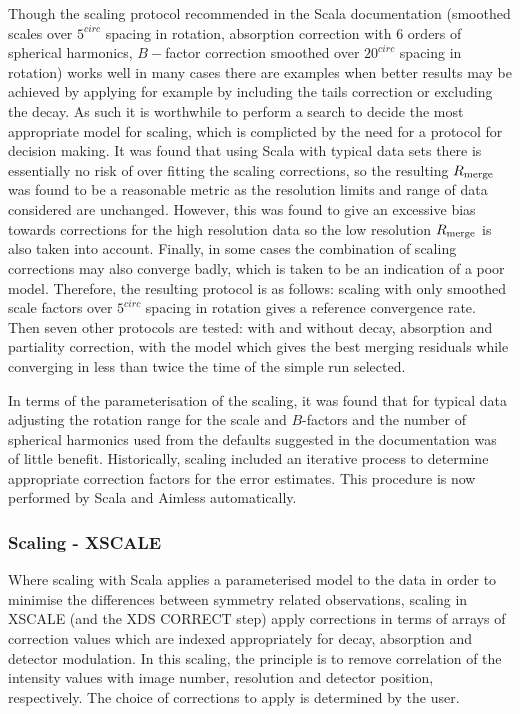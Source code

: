 \documentclass[preprint,pdf]{iucr}
\begin{document}
Though the scaling protocol recommended in the Scala documentation
(smoothed scales over $5^{circ}$ spacing in rotation, absorption
correction with 6 orders of spherical harmonics, $B-$factor correction
smoothed over $20^{circ}$ spacing in rotation) works well in many
cases there are examples when better results may be achieved by
applying for example by including the tails correction or excluding the
decay. As such it is worthwhile to perform a search to decide the most
appropriate model for scaling, which is complicted by the need for a
protocol for decision making. It was found that using Scala
with typical data sets there is essentially no risk of over fitting
the scaling corrections, so the resulting $R_{\rm{merge}}$ was found to
be a reasonable metric as the resolution limits and range of data
considered are unchanged. However, this was found to give an excessive
bias towards corrections for the high resolution data so the low
resolution $R_{\rm{merge}}$ is also taken into account. Finally, in
some cases the combination of scaling corrections may also converge
badly, which is taken to be an indication of a poor model. Therefore,
the resulting protocol is as follows: scaling with only smoothed scale
factors over $5^{circ}$ spacing in rotation gives a reference
convergence rate. Then seven other protocols are tested: with and
without decay, absorption and partiality correction, with the model
which gives the best merging residuals while converging in less than
twice the time of the simple run selected. 

In terms of the parameterisation of the scaling, it was found that for
typical data adjusting the rotation range for the scale and
$B$-factors and the number of spherical harmonics used from the
defaults suggested in the documentation was of little benefit.
Historically, scaling included an iterative process to
determine appropriate correction factors for the error estimates. This
procedure is now performed by Scala and Aimless automatically.

\subsubsection{Scaling - XSCALE}

Where scaling with Scala applies a parameterised model to the data
in order to minimise the differences between symmetry related
observations, scaling in XSCALE (and the XDS CORRECT step) apply
corrections in terms of arrays of correction values which are indexed
appropriately for decay, absorption and detector modulation. In this
scaling, the principle is to remove correlation of the intensity values
with image number, resolution and detector position, 
respectively. The choice of corrections to apply
is determined by the user.
\end{document}
